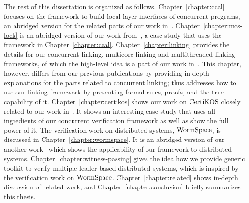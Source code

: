 The rest of this dissertation is organized as follows. Chapter~\ref{chapter:ccal} focuses 
on the framework to build local layer interfaces of concurrent programs, an abridged version for the related parts of our work in~\cite{concurrency}.
Chapter~\ref{chapter:mcs-lock} is an abridged version of our work from~\cite{mcslock},
a case study that uses the framework in Chapter~\ref{chapter:ccal}. 
Chapter~\ref{chapter:linking} provides 
the details for our concurrent linking,  multicore linking
and multithreaded linking frameworks, 
of which the high-level idea is a part of our work in~\cite{concurrency}.
This chapter, however, differs from our previous publications by providing
in-depth explanations for the parts related to concurrent linking; 
thus
addresses how to use our linking framework by presenting formal rules, proofs,  and the true capability of it.
Chapter~\ref{chapter:certikos} shows our work on $\mathrm{CertiKOS}$
closely related to our work in~\cite{certikos:osdi16}. 
It shows an interesting case study that uses all ingredients of our concurrent verification framework as well as 
show the full power of it.
The verification work on distributed systems, $\mathrm{WormSpace}$,
is discussed in Chapter~\ref{chapter:wormspace}.
It is an abridged version of our another work~\cite{wormspace}
which shows the applicability of our framework
to distributed systems.
Chapter~\ref{chapter:witness-passing} gives the idea how we provide 
generic toolkit to verify multiple leader-based distributed systems,
which is inspired by the verification work on $\mathrm{WormSpace}$.
Chapter~\ref{chapter:related} shows in-depth discussion of related work,
 and Chapter~\ref{chapter:conclusion} briefly summarizes this thesis.


